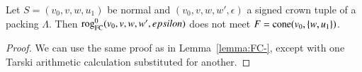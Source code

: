 \begin{lemma}
Let $S=(v_0,v,w,u_1)$ be normal and $(v_0,v,w,w',\epsilon)$ a signed crown tuple
of a packing $\Lambda$.  
Then
${\operatorname{rog}}^0_{\text{FC}}(v_0,v,w,w',epsilon)$
does not meet $F={\operatorname{cone}}(v_0,\{w,u_1\})$.
\end{lemma}

\begin{proof}  We can use the same proof as in Lemma~\ref{lemma:FC-},
except with one Tarski arithmetic calculation 
substituted for 
another.
\end{proof}


%
%
%
%
